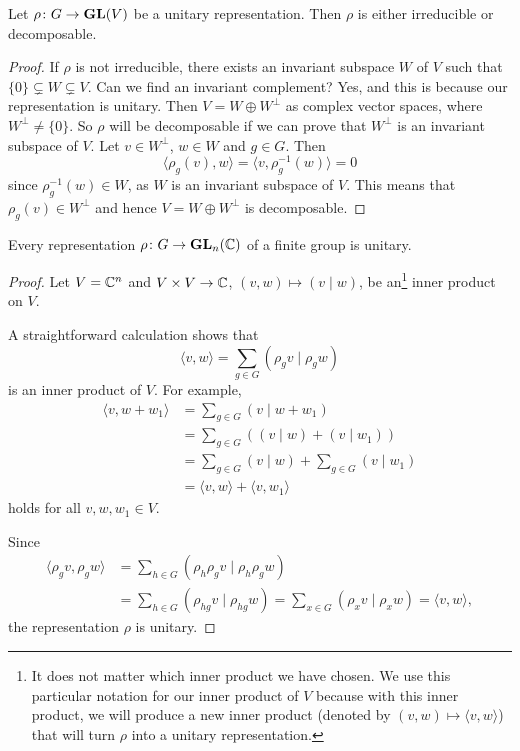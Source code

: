 \begin{proposition}
\label{pro:irr_or_dec}
Let $\rho\colon G\to\mathbf{GL}(V)$ be a unitary representation. Then $\rho$ is either
irreducible or decomposable.
\end{proposition}

\begin{proof}
	If $\rho$ is not irreducible, there exists an invariant subspace $W$ of $V$ such that
	$\{0\}\subsetneq W\subsetneq V$. Can we find an invariant complement? Yes, and this is because 
        our representation is unitary.  
	Then $V=W\oplus W^{\perp}$ as complex vector spaces, where 
	$W^\perp\ne\{0\}$. So $\rho$ will be decomposable if we can prove that
	$W^\perp$ is an invariant subspace of $V$. 
	Let $v\in W^\perp$, $w\in W$ and $g\in G$. Then  
	\[
	\langle \rho_g(v),w\rangle=\langle v,\rho_g^{-1}(w)\rangle=0   
	\]
	since $\rho_g^{-1}(w)\in W$, as $W$ is an invariant subspace of $V$. This means that 
	$\rho_g(v)\in W^\perp$ and hence $V=W\oplus W^{\perp}$ is decomposable.  
\end{proof}

\begin{theorem}
    Every representation $\rho\colon G\to\mathbf{GL}_n(\mathbb{C})$ 
    of a finite group is unitary.
\end{theorem}

\begin{proof}
    Let $V=\mathbb{C}^n$ and 
    $V\times V\to\mathbb{C}$, $(v,w)\mapsto (v\mid w)$, be an\footnote{It does not matter which inner product we have chosen. 
    We use this particular notation for our inner product of $V$ because  
    with this inner product, we will 
    produce a new inner product (denoted by $(v,w)\mapsto \langle v, w\rangle$) that will turn $\rho$ 
    into a unitary representation.} inner
    product on $V$. 
   
    A straightforward calculation shows that
    \[
    \langle v,w\rangle=\sum_{g\in G}(\rho_gv\mid \rho_gw)
    \]
    is an inner product of $V$. For example, 
    \begin{align*}
    \langle v,w+w_1\rangle&=\sum_{g\in G}(v\mid w+w_1)\\
    &=\sum_{g\in G}\left((v\mid w)+(v\mid w_1)\right)\\
    &=\sum_{g\in G}(v\mid w)+\sum_{g\in G}(v\mid w_1)\\
    &=\langle v,w\rangle+\langle v,w_1\rangle 
    \end{align*}
    holds for all $v,w,w_1\in V$. 
    
    Since
    \begin{align*}
    \langle\rho_gv,\rho_gw\rangle&=\sum_{h\in G}(\rho_h\rho_gv\mid \rho_h\rho_gw)\\
    &=\sum_{h\in G}(\rho_{hg}v\mid\rho_{hg}w)=\sum_{x\in G}(\rho_xv\mid\rho_xw)=\langle v,w\rangle,
    \end{align*}
    the representation $\rho$ is unitary.
\end{proof}

